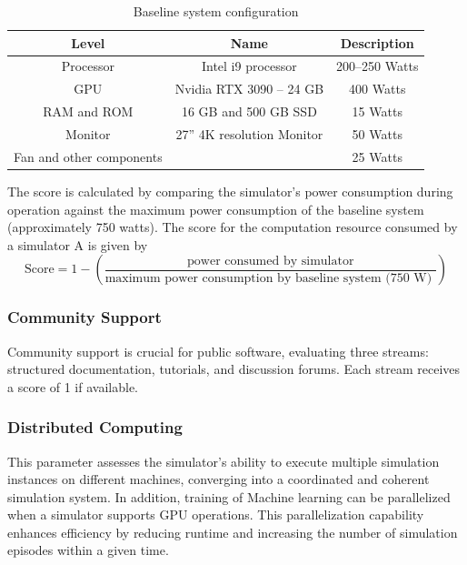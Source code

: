 \documentclass[12pt,twoside,a4paper,parskip]{scrbook} %
\begin{document}
\begin{table}[htbp]
  \centering
  
  \begin{minipage}{\linewidth}
    \renewcommand{\arraystretch}{1.0} 
    \begin{tabular}{|c|c|c|}
      \hline
      \textbf{Level} & \textbf{Name} & \textbf{Description} \\
      \hline
        Processor & Intel i9 processor & 200--250 Watts \\ \hline 
        GPU & Nvidia RTX 3090 – 24 GB & 400 Watts \\ \hline 
        RAM and ROM & 16 GB and 500 GB SSD & 15 Watts \\ \hline 
        Monitor & 27” 4K resolution Monitor & 50 Watts \\ \hline
        Fan and other components & & 25 Watts \\ \hline
        \end{tabular}
  \end{minipage}
  \caption{Baseline system configuration}
  \label{tab:systab}
\end{table}
The score is calculated by comparing the simulator's power consumption during operation against the maximum power consumption of the baseline system (approximately 750 watts). 
The score for the computation resource consumed by a simulator A is given by  
\[ \text{Score} = 1 - \left(\frac{\text{power consumed by simulator}}{\text{maximum power consumption by baseline system (750 W) }}\right) \]

\subsubsection{Community Support}
Community support is crucial for public software, evaluating three streams: structured documentation, tutorials, and discussion forums. Each stream receives a score of 1 if available.

\subsubsection {Distributed Computing}
This parameter assesses the simulator's ability to execute multiple simulation instances on different machines, converging into a coordinated and coherent simulation system. In addition, training of Machine learning can be parallelized when a simulator supports GPU operations.  This parallelization capability enhances efficiency by reducing runtime and increasing the number of simulation episodes within a given time. 
\end{document}
